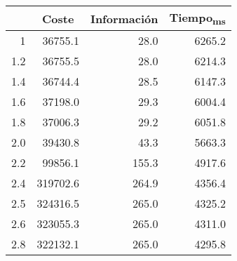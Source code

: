 \documentclass{article}
\begin{document}
    \begin{center}
    \begin{tabular}{ | r | r | r | r | }
      \hline
      \rowcolor{DarkGrey}
      \multicolumn{1}{|c|}{Peso información} & \multicolumn{1}{|c|}{Coste} & \multicolumn{1}{|c|}{Información} & \multicolumn{1}{|c|}{Tiempo\textsubscript{ms}} \\ \hline \hline
      1 & 36755.1 & 28.0 & 6265.2 \\ \hline
      \rowcolor{LightGrey}
      1.2 & 36755.5 & 28.0 & 6214.3 \\ \hline
      1.4 & 36744.4 & 28.5 & 6147.3 \\ \hline
      \rowcolor{LightGrey}
      1.6 & 37198.0 & 29.3 & 6004.4 \\ \hline
      1.8 & 37006.3 & 29.2 & 6051.8 \\ \hline
      \rowcolor{LightGrey}
      2.0 & 39430.8 & 43.3 & 5663.3 \\ \hline
      2.2 & 99856.1 & 155.3 & 4917.6 \\ \hline
      \rowcolor{LightGrey}
      2.4 & 319702.6 & 264.9 & 4356.4 \\ \hline
      2.5 & 324316.5 & 265.0 & 4325.2 \\ \hline
      \rowcolor{LightGrey}
      2.6 & 323055.3 & 265.0 & 4311.0 \\ \hline
      2.8 & 322132.1 & 265.0 & 4295.8 \\ \hline
    \end{tabular}
    \label{table:T5}
  \end{center}
\end{document}
